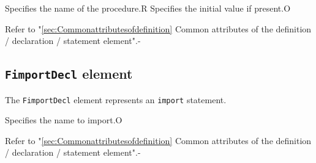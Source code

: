 \begin{XcodeMLChildElements}
{Specifies the name of the procedure.}{R}
{Specifies the initial value if present.}{O}
\end{XcodeMLChildElements}

\begin{XcodeMLAttributes}
{Refer to "\ref{sec:Commonattributesofdefinition} Common attributes of the definition / declaration / statement element".}{-}
\end{XcodeMLAttributes}


\subsection{ {\tt FimportDecl} element}

The {\tt FimportDecl} element represents an {\tt import} statement.


\begin{XcodeMLChildElements}
{Specifies the name to import.}{O}
\end{XcodeMLChildElements}

\begin{XcodeMLAttributes}
{Refer to "\ref{sec:Commonattributesofdefinition} Common attributes of the definition / declaration / statement element".}{-}
\end{XcodeMLAttributes}


